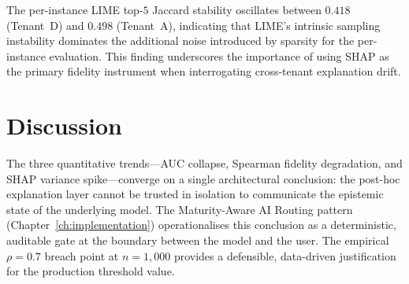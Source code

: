 The per-instance LIME top-$5$ Jaccard stability oscillates between $0.418$ (Tenant~D) and $0.498$ (Tenant~A), indicating that LIME's intrinsic sampling instability dominates the additional noise introduced by sparsity for the per-instance evaluation. This finding underscores the importance of using SHAP as the primary fidelity instrument when interrogating cross-tenant explanation drift.

\section{Discussion}
\label{sec:results_discussion}

The three quantitative trends---AUC collapse, Spearman fidelity degradation, and SHAP variance spike---converge on a single architectural conclusion: the post-hoc explanation layer cannot be trusted in isolation to communicate the epistemic state of the underlying model. The Maturity-Aware AI Routing pattern (Chapter~\ref{ch:implementation}) operationalises this conclusion as a deterministic, auditable gate at the boundary between the model and the user. The empirical $\rho = 0.7$ breach point at $n = 1{,}000$ provides a defensible, data-driven justification for the production threshold value.
